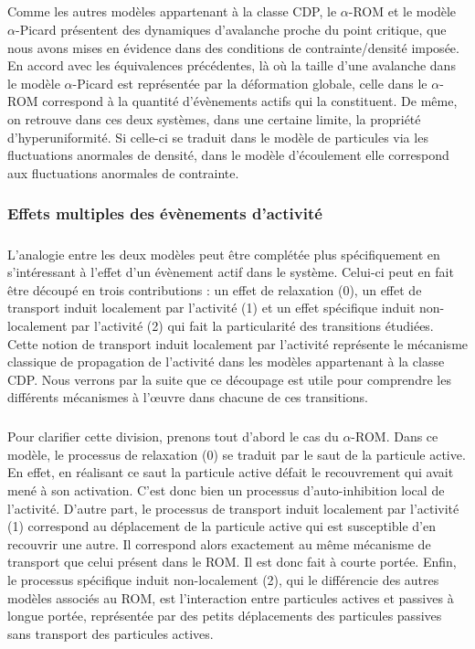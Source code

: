 \subparagraph{}Comme les autres modèles appartenant à la classe CDP, le $\alpha$-ROM et le modèle $\alpha$-Picard présentent des dynamiques d'avalanche proche du point critique, que nous avons mises en évidence dans des conditions de contrainte/densité imposée. En accord avec les équivalences précédentes, là où la taille d'une avalanche dans le modèle $\alpha$-Picard est représentée par la déformation globale, celle dans le $\alpha$-ROM correspond à la quantité d'évènements actifs qui la constituent. De même, on retrouve dans ces deux systèmes, dans une certaine limite, la propriété d'hyperuniformité. Si celle-ci se traduit dans le modèle de particules via les fluctuations anormales de densité, dans le modèle d'écoulement elle correspond aux fluctuations anormales de contrainte.

\subsubsection{Effets multiples des évènements d'activité}

\subparagraph{}L'analogie entre les deux modèles peut être complétée plus spécifiquement en s'intéressant à  l'effet d'un évènement actif dans le système. Celui-ci peut en fait être découpé en trois contributions : un effet de relaxation (0), un effet de transport induit localement par l'activité (1) et un effet spécifique induit non-localement par l'activité (2) qui fait la particularité des transitions étudiées. Cette notion de transport induit localement par l'activité représente le mécanisme classique de propagation de l'activité dans les modèles appartenant à la classe CDP. Nous verrons par la suite que ce découpage est utile pour comprendre les différents mécanismes à l’œuvre dans chacune de ces transitions.

\subparagraph{}Pour clarifier cette division, prenons tout d'abord le cas du $\alpha$-ROM. Dans ce modèle, le processus de relaxation (0) se traduit par le saut de la particule active. En effet, en réalisant ce saut la particule active défait le recouvrement qui avait mené à son activation. C'est donc bien un processus d'auto-inhibition local de l'activité. D'autre part, le processus de transport induit localement par l'activité (1) correspond au déplacement de la particule active qui est susceptible d'en recouvrir une autre. Il correspond alors exactement au même mécanisme de transport que celui présent dans le ROM. Il est donc fait à courte portée. Enfin, le processus spécifique induit non-localement (2), qui le différencie des autres modèles associés au ROM, est l'interaction entre particules actives et passives à longue portée, représentée par des petits déplacements des particules passives sans transport des particules actives. 

